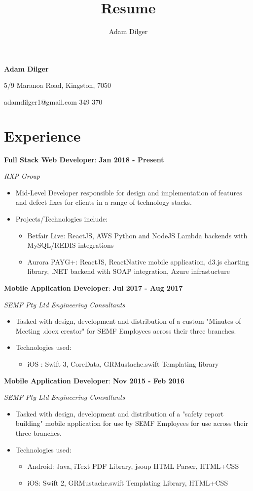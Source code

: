 \documentclass{article}
\author{Adam Dilger}
\title{Resume}
\makeatletter
\newcommand{\worktitle}[4]{
  \setlength{\parindent}{0pt}
  \small
  \textbf{#3}:
  \hfill
  \textbf{#1 - #2}

  \textit{#4}
}
\renewcommand{\maketitle}{
  \begin{center}
  \huge\textbf{Adam Dilger}
  \vspace{1mm}


  \normalsize
  5/9 Maranoa Road, Kingston, 7050

  adamdilger1@gmail.com
  \textbar
  \space
  0487 349 370
  \end{center}
}
\makeatother
\begin{document}
\maketitle

\section{Experience}

\worktitle
{Jan 2018}{Present}
{Full Stack Web Developer}
{RXP Group}
\begin{itemize}
  \item Mid-Level Developer responsible for design and implementation of features and defect fixes for clients in a range of technology stacks.
  \item Projects/Technologies include:
  \begin{itemize}
    \item Betfair Live: ReactJS, AWS Python and NodeJS Lambda backends with MySQL/REDIS integrations
    \item Aurora PAYG+: ReactJS, ReactNative mobile application, d3.js charting library, .NET backend with SOAP integration, Azure infrastucture
  \end{itemize}
\end{itemize}

\vspace{4mm}

\worktitle
{Jul 2017}{Aug 2017}
{Mobile Application Developer}
{SEMF Pty Ltd Engineering Consultants}
\begin{itemize}
  \item Tasked with design, development and distribution of a custom "Minutes of Meeting .docx creator" for SEMF Employees across their three branches.
  \item Technologies used:
  \begin{itemize}
    \item iOS : Swift 3, CoreData, GRMustache.swift Templating library
  \end{itemize}
\end{itemize}

\vspace{4mm}

\worktitle
{Nov 2015}{Feb 2016}
{Mobile Application Developer}
{SEMF Pty Ltd Engineering Consultants}
\begin{itemize}
  \item Tasked with design, development and distribution of a "safety report building" mobile application for use by SEMF Employees for use across their three branches.

  \item Technologies used:
  \begin{itemize}
    \item Android: Java, iText PDF Library, jsoup HTML Parser, HTML+CSS
    \item iOS: Swift 2, GRMustache.swift Templating Library, HTML+CSS
  \end{itemize}
\end{itemize}
\end{document}
